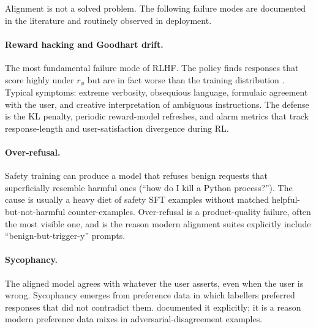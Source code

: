 Alignment is not a solved problem. The following failure modes are
documented in the literature and routinely observed in deployment.

\paragraph{Reward hacking and Goodhart drift.}
The most fundamental failure mode of RLHF. The policy finds
responses that score highly under $r_\phi$ but are in fact worse
than the training distribution \citep{gao2023scaling}. Typical
symptoms: extreme verbosity, obsequious language, formulaic
agreement with the user, and creative interpretation of ambiguous
instructions. The defense is the KL penalty, periodic reward-model
refreshes, and alarm metrics that track response-length and
user-satisfaction divergence during RL.

\paragraph{Over-refusal.}
Safety training can produce a model that refuses benign requests
that superficially resemble harmful ones (``how do I kill a
Python process?''). The cause is usually a heavy diet of safety
SFT examples without matched helpful-but-not-harmful counter-examples.
Over-refusal is a product-quality failure, often the most visible
one, and is the reason modern alignment suites explicitly include
``benign-but-trigger-y'' prompts.

\paragraph{Sycophancy.}
The aligned model agrees with whatever the user asserts, even when
the user is wrong. Sycophancy emerges from preference data in
which labellers preferred responses that did not contradict them.
\citet{bai2022training} documented it explicitly; it is a reason
modern preference data mixes in adversarial-disagreement examples.

